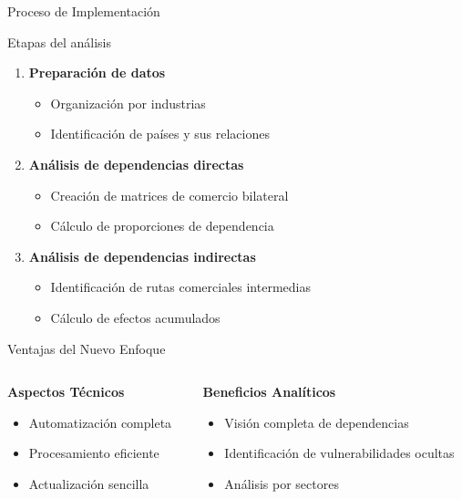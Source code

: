 \documentclass{beamer}
\begin{document}
\begin{frame}{Proceso de Implementación}
    \begin{block}{Etapas del análisis}
        \begin{enumerate}
            \item \textbf{Preparación de datos}
                \begin{itemize}
                    \item Organización por industrias
                    \item Identificación de países y sus relaciones
                \end{itemize}
            \item \textbf{Análisis de dependencias directas}
                \begin{itemize}
                    \item Creación de matrices de comercio bilateral
                    \item Cálculo de proporciones de dependencia
                \end{itemize}
            \item \textbf{Análisis de dependencias indirectas}
                \begin{itemize}
                    \item Identificación de rutas comerciales intermedias
                    \item Cálculo de efectos acumulados
                \end{itemize}
        \end{enumerate}
    \end{block}
\end{frame}

\begin{frame}{Ventajas del Nuevo Enfoque}
    \begin{columns}[t]
        \begin{column}{0.5\textwidth}
            \textbf{Aspectos Técnicos}
            \begin{itemize}
                \item Automatización completa
                \item Procesamiento eficiente
                \item Actualización sencilla
            \end{itemize}
        \end{column}
        \begin{column}{0.5\textwidth}
            \textbf{Beneficios Analíticos}
            \begin{itemize}
                \item Visión completa de dependencias
                \item Identificación de vulnerabilidades ocultas
                \item Análisis por sectores
            \end{itemize}
        \end{column}
    \end{columns}
\end{frame}
\end{document}
